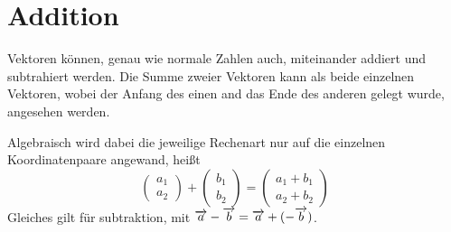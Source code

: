 \documentclass{article}
\begin{document}
\section{Addition} 
Vektoren können, genau wie normale Zahlen auch, miteinander addiert und subtrahiert werden. Die Summe zweier Vektoren kann als beide einzelnen Vektoren, wobei der Anfang des einen and das Ende des anderen gelegt wurde, angesehen werden. \newline 
\begin{wrapfigure}[6]{l}{5cm}
  \centering
\end{wrapfigure}
Algebraisch wird dabei die jeweilige Rechenart nur auf die einzelnen Koordinatenpaare angewand, heißt 
\[ 
 \begin{pmatrix} a_1 \\ a_2 \end{pmatrix} +
 \begin{pmatrix} b_1 \\ b_2 \end{pmatrix} =
 \begin{pmatrix} a_1 + b_1 \\ a_2 + b_2 \end{pmatrix} 
\]
Gleiches gilt für subtraktion, mit $\overrightarrow{a} - \overrightarrow{b} = \overrightarrow{a} + (-\overrightarrow{b})$.
 
\end{document}
